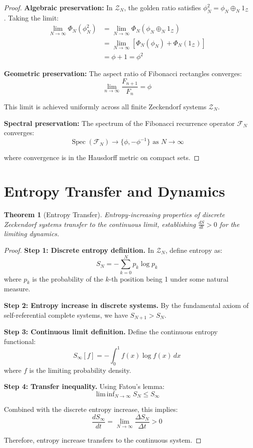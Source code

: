 \documentclass[12pt]{article}
\theoremstyle{plain}
\newtheorem{theorem}{Theorem}[section]
\theoremstyle{definition}
\DeclareMathOperator{\Spec}{Spec}
\DeclareMathOperator{\liminf}{lim\,inf}
\begin{document}
\begin{proof}
\textbf{Algebraic preservation:}
In $\mathcal{Z}_N$, the golden ratio satisfies $\phi_N^2 = \phi_N \oplus_N 1_{\mathcal{Z}}$.
Taking the limit:
\begin{align}
\lim_{N \to \infty} \Phi_N(\phi_N^2) &= \lim_{N \to \infty} \Phi_N(\phi_N \oplus_N 1_{\mathcal{Z}})\\
&= \lim_{N \to \infty} [\Phi_N(\phi_N) + \Phi_N(1_{\mathcal{Z}})]\\
&= \phi + 1 = \phi^2
\end{align}

\textbf{Geometric preservation:}
The aspect ratio of Fibonacci rectangles converges:
$$\lim_{n \to \infty} \frac{F_{n+1}}{F_n} = \phi$$

This limit is achieved uniformly across all finite Zeckendorf systems $\mathcal{Z}_N$.

\textbf{Spectral preservation:}
The spectrum of the Fibonacci recurrence operator $\mathcal{F}_N$ converges:
$$\Spec(\mathcal{F}_N) \to \{\phi, -\phi^{-1}\} \text{ as } N \to \infty$$

where convergence is in the Hausdorff metric on compact sets.
\end{proof}

\section{Entropy Transfer and Dynamics}

\begin{theorem}[Entropy Transfer]
\label{thm:entropy-transfer}
Entropy-increasing properties of discrete Zeckendorf systems transfer to the continuous limit, establishing $\frac{dS}{dt} > 0$ for the limiting dynamics.
\end{theorem}

\begin{proof}
\textbf{Step 1: Discrete entropy definition.}
In $\mathcal{Z}_N$, define entropy as:
$$S_N = -\sum_{k=0}^{N} p_k \log p_k$$
where $p_k$ is the probability of the $k$-th position being 1 under some natural measure.

\textbf{Step 2: Entropy increase in discrete systems.}
By the fundamental axiom of self-referential complete systems, we have $S_{N+1} > S_N$.

\textbf{Step 3: Continuous limit definition.}
Define the continuous entropy functional:
$$S_\infty[f] = -\int_0^1 f(x) \log f(x) \, dx$$
where $f$ is the limiting probability density.

\textbf{Step 4: Transfer inequality.}
Using Fatou's lemma:
$$\liminf_{N \to \infty} S_N \leq S_\infty$$

Combined with the discrete entropy increase, this implies:
$$\frac{dS_\infty}{dt} = \lim_{N \to \infty} \frac{\Delta S_N}{\Delta t} > 0$$

Therefore, entropy increase transfers to the continuous system.
\end{proof}
\end{document}
